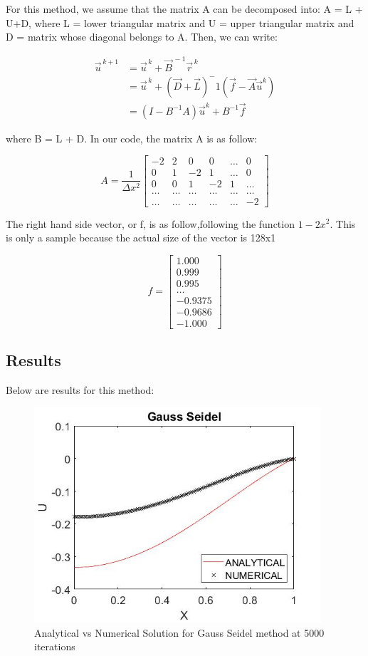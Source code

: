 \documentclass{article}
\begin{document}
For this method, we assume that the matrix A can be decomposed into: A = L + U+D, where L = lower triangular matrix and U = upper triangular matrix and D = matrix whose diagonal belongs to A. Then, we can write: 

\begin{align*}
\vec{u}^{\,k+1} &= \vec{u}^{\,k} + \vec{B}^{\,-1}\vec{r}^{\,k}\\
 &= \vec{u}^{\,k} + (\vec{D}+\vec{L})^-1(\vec{f}-\vec{A}\vec{u}^k)\\
 &=(I-B^{-1}A)\vec{u}^{k} + B^{-1}\vec{f}
\end{align*}

\noindent
where B = L + D.  In our code, the matrix A is as follow: 

\[
A = \dfrac{1}{\Delta x^2}\begin{bmatrix}
-2&2& 0 & 0 & \dots & 0 \\
0&1 & -2 & 1 & \dots & 0 \\
0&0 & 1 & -2 & 1 & \dots \\
\dots  & \dots  & \dots  & \dots & \dots & \dots  \\
\dots & \dots & \dots & \dots & \dots & -2
\end{bmatrix}
\]

\noindent
The right hand side vector, or f, is as follow,following the function $1-2x^2$. This is only a sample because the actual size of the vector is 128x1

\[
f = \begin{bmatrix}
	1.000 \\ 0.999 \\ 0.995 \\ \dots \\ -0.9375 \\-0.9686 \\ -1.000 
\end{bmatrix}
\]
\newpage


\subsection{Results}

Below are results for this method: 


	\begin{figure}[H]
	\includegraphics[width=\linewidth,height=80mm]{GS.jpg}
	
	
	\caption{Analytical vs Numerical Solution for Gauss Seidel method at 5000 iterations}
	\end{figure}
\end{document}
